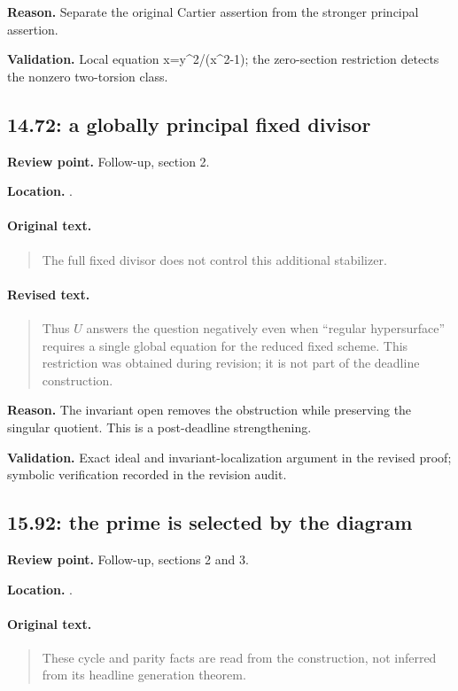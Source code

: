 \noindent\textbf{Reason.} Separate the original Cartier assertion from the stronger principal assertion.

\noindent\textbf{Validation.} Local equation x=y\textasciicircum{}2/(x\textasciicircum{}2-1); the zero-section restriction detects the nonzero two-torsion class.

\subsection{14.72: a globally principal fixed divisor}
\noindent\textbf{Review point.} Follow-up, section 2.\par
\noindent\textbf{Location.} .

\paragraph{Original text.}
\begin{quote}\small
The full fixed divisor
does not control this additional stabilizer.
\end{quote}

\paragraph{Revised text.}
\begin{quote}\small
Thus \(U\) answers the question negatively even
when ``regular hypersurface'' requires a single global equation for
the reduced fixed scheme. This restriction was obtained during revision;
it is not part of the deadline construction.
\end{quote}

\noindent\textbf{Reason.} The invariant open removes the obstruction while preserving the singular quotient. This is a post-deadline strengthening.

\noindent\textbf{Validation.} Exact ideal and invariant-localization argument in the revised proof; symbolic verification recorded in the revision audit.

\subsection{15.92: the prime is selected by the diagram}
\noindent\textbf{Review point.} Follow-up, sections 2 and 3.\par
\noindent\textbf{Location.} .

\paragraph{Original text.}
\begin{quote}\small
These cycle and parity facts are read from the construction,
not inferred from its headline generation theorem.
\end{quote}

